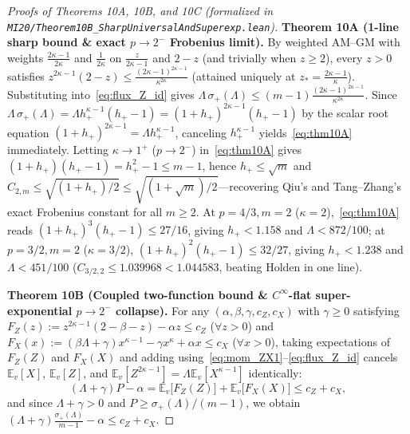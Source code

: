\documentclass[10pt,letterpaper]{article}
\begin{document}
\begin{proof}[Proofs of Theorems 10A, 10B, and 10C (formalized in \texttt{MI20/Theorem10B\_\allowbreak SharpUniversalAndSuperexp.lean})]
\textbf{Theorem 10A (1-line sharp bound \& exact $p \to 2^-$ Frobenius limit).}
By weighted AM--GM with weights $\frac{2\kappa-1}{2\kappa}$ and $\frac{1}{2\kappa}$ on $\frac{z}{2\kappa-1}$ and $2 - z$ (and trivially when $z \ge 2$), every $z > 0$ satisfies $z^{2\kappa-1}(2 - z) \le \frac{(2\kappa-1)^{2\kappa-1}}{\kappa^{2\kappa}}$ (attained uniquely at $z_* = \frac{2\kappa-1}{\kappa}$). Substituting into~\eqref{eq:flux_Z_id} gives $\Lambda\,\sigma_+(\Lambda) \le (m-1)\frac{(2\kappa-1)^{2\kappa-1}}{\kappa^{2\kappa}}$. Since $\Lambda\,\sigma_+(\Lambda) = \Lambda h_+^{\kappa-1}(h_+ - 1) = (1 + h_+)^{2\kappa-1}(h_+ - 1)$ by the scalar root equation $(1+h_+)^{2\kappa-1} = \Lambda h_+^{\kappa-1}$, canceling $h_+^{\kappa-1}$ yields~\eqref{eq:thm10A} immediately. Letting $\kappa \to 1^+$ ($p \to 2^-$) in~\eqref{eq:thm10A} gives $(1 + h_+)(h_+ - 1) = h_+^2 - 1 \le m - 1$, hence $h_+ \le \sqrt{m}$ and $C_{2,m} \le \sqrt{(1 + h_+)/2} \le \sqrt{(1 + \sqrt{m})/2}$—recovering Qiu's and Tang--Zhang's exact Frobenius constant for all $m \ge 2$. At $p = 4/3, m = 2$ ($\kappa = 2$),~\eqref{eq:thm10A} reads $(1+h_+)^3(h_+ - 1) \le 27/16$, giving $h_+ < 1.158$ and $\Lambda < 872/100$; at $p = 3/2, m = 2$ ($\kappa = 3/2$), $(1+h_+)^2(h_+ - 1) \le 32/27$, giving $h_+ < 1.238$ and $\Lambda < 451/100$ ($C_{3/2,2} \le 1.039968 < 1.044583$, beating Holden in one line).

\textbf{Theorem 10B (Coupled two-function bound \& $C^\infty$-flat super-exponential $p \to 2^-$ collapse).}
For any $(\alpha, \beta, \gamma, c_Z, c_X)$ with $\gamma \ge 0$ satisfying $F_Z(z) := z^{2\kappa-1}(2-\beta-z) - \alpha z \le c_Z$ ($\forall z > 0$) and $F_X(x) := (\beta\Lambda + \gamma)x^{\kappa-1} - \gamma x^\kappa + \alpha x \le c_X$ ($\forall x > 0$), taking expectations of $F_Z(Z)$ and $F_X(X)$ and adding using~\eqref{eq:mom_ZX1}--\eqref{eq:flux_Z_id} cancels $\mathbb{E}_v[X]$, $\mathbb{E}_v[Z]$, and $\mathbb{E}_v[Z^{2\kappa-1}] = \Lambda\mathbb{E}_v[X^{\kappa-1}]$ identically:
\[
  (\Lambda + \gamma)P - \alpha
  = \mathbb{E}_v\bigl[F_Z(Z)\bigr] + \mathbb{E}_v\bigl[F_X(X)\bigr]
  \le c_Z + c_X,
\]
and since $\Lambda + \gamma > 0$ and $P \ge \sigma_+(\Lambda)/(m-1)$, we obtain $(\Lambda + \gamma)\frac{\sigma_+(\Lambda)}{m-1} - \alpha \le c_Z + c_X$.


\end{proof}
\end{document}
